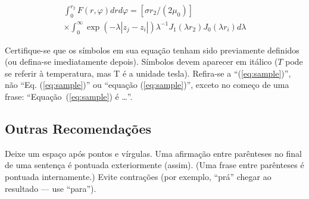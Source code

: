 \begin{multline} 
\int_0^{r_2}  F (r, \varphi ) dr d\varphi =  [\sigma r_2 / (2 \mu_0 )] \\
\times   \int_0^{\infty} \exp(-\lambda |z_j - z_i |) \lambda^{-1} J_1 (\lambda  r_2 ) J_0 (\lambda r_i ) d\lambda 
\label{eq:sample2}
\end{multline}

Certifique-se que os símbolos em sua equação tenham sido previamente definidos (ou defina-se imediatamente depois). Símbolos devem aparecer em itálico ($T$ pode
se referir à temperatura, mas T é a unidade tesla). 
Refira-se a ``(\ref{eq:sample})'', não ``Eq. (\ref{eq:sample})'' ou ``equação
(\ref{eq:sample})'', exceto no começo de uma frase: ``Equação~(\ref{eq:sample}) é \ldots''. 

\subsection{Outras Recomendações}

Deixe um espaço após pontos e vírgulas. 
Uma afirmação entre parênteses no final de uma sentença é pontuada exteriormente
(assim). (Uma frase entre parênteses é pontuada internamente.) Evite contrações
(por exemplo, ``prá'' chegar ao resultado --- use ``para'').
